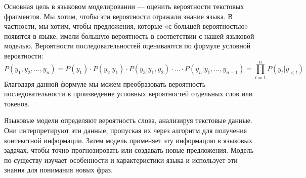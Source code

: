 Основная цель в языковом моделировании --- оценить вероятности текстовых фрагментов. Мы хотим, чтобы эти вероятности отражали знание языка. В частности, мы хотим, чтобы предложения, которые «с большей вероятностью» появятся в языке, имели большую вероятность в соответствии с нашей языковой моделью. Вероятности последовательностей оцениваются по формуле условной вероятности:
\begin{equation}
	P(y_1, y_2,\dots,y_n) = P(y_1) \cdot P(y_2|y_1) \cdot P(y_3|y_1, y_2) \cdot \dots \cdot P(y_n|y_1,\dots,y_{n-1}) = \prod_{t=1}^n{P(y_t|y_{<t})}
\end{equation}
Благодаря данной формуле мы можем преобразовать вероятность последовательности в произведение условных вероятностей отдельных слов или токенов.~\cite{lena-voita-lm}

Языковые модели определяют вероятность слова, анализируя текстовые данные. Они интерпретируют эти данные, пропуская их через алгоритм для получения контекстной информации. Затем модель применяет эту информацию в языковых задачах, чтобы точно прогнозировать или создавать новые предложения. Модель по существу изучает особенности и характеристики языка и использует эти знания для понимания новых фраз.

